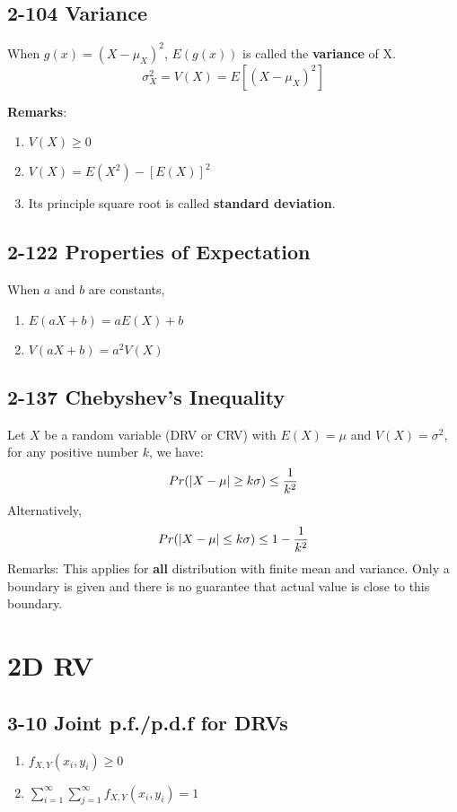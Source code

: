 \documentclass[12pt,landscape]{article}
\begin{document}
\begin{multicols}{3}
    \subsection{2-104 Variance}
    When $g(x) = (X - \mu_X)^2$, $E(g(x))$ is called the \textbf{variance} of X.
        $$ \sigma_X^2 = V(X) = E[(X - \mu_X)^2] $$
    
    \textbf{Remarks}:
    \begin{enumerate}
        \item $V(X) \geq 0$
        \item $V(X) = E(X^2) - [E(X)]^2$
        \item Its principle square root is called \textbf{standard deviation}.
    \end{enumerate}

    \subsection{2-122 Properties of Expectation}
    When $a$ and $b$ are constants,
    \begin{enumerate}
        \item $E(aX + b) = aE(X) + b$
        \item $V(aX + b) = a^2V(X)$
    \end{enumerate}
    
    \subsection{2-137 Chebyshev's Inequality}
    Let $X$ be a random variable (DRV or CRV) with $E(X) = \mu$ and $V(X) = \sigma^2$, for any positive
    number $k$, we have:
        $$ Pr(\abs{X - \mu} \geq k\sigma) \leq \frac{1}{k^2} $$
    Alternatively,
        $$ Pr(\abs{X - \mu} \leq k\sigma) \leq 1 - \frac{1}{k^2} $$
    Remarks: This applies for \textbf{all} distribution with finite mean and variance. Only a boundary
    is given and there is no guarantee that actual value is close to this boundary.

    
    \section{2D RV}
    
    \subsection{3-10 Joint p.f./p.d.f for DRVs}
    \begin{enumerate}
        \item $f_{X,Y}(x_i, y_i) \geq 0$
        \item $\sum_{i = 1}^{\infty} \sum_{j = 1}^{\infty} f_{X,Y}(x_i, y_i) = 1$
    \end{enumerate}


\end{multicols}
\end{document}
